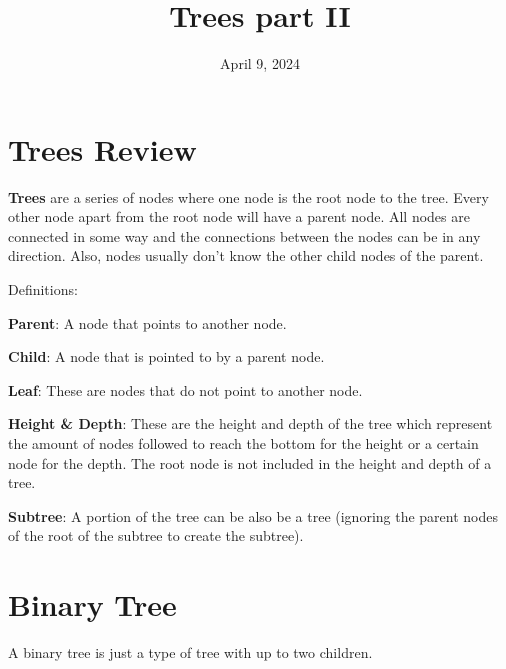 \documentclass[11pt,a4paper,english]{article}
\begin{document}
\title{Trees part II}
\date{April 9, 2024}
\maketitle

\tableofcontents
\section{Trees Review}

\textbf{Trees} are a series of nodes where one node is the root node to the tree. Every other node apart from the root node will have a parent node. All nodes are connected in some way and the connections between the nodes can be in any direction. Also, nodes usually don't know the other child nodes of the parent.

\bigskip
\begin{bluebox}{Definitions:}{

  \begin{itemize} {

      \item \textbf{Parent}: A node that points to another node.
      \item \textbf{Child}: A node that is pointed to by a parent node.
      \item \textbf{Leaf}: These are nodes that do not point to another node.
      \item \textbf{Height \& Depth}: These are the height and depth of the tree which represent the amount of nodes followed to reach the bottom for the height or a certain node for the depth. The root node is not included in the height and depth of a tree.
      \item \textbf{Subtree}: A portion of the tree can be also be a tree (ignoring the parent nodes of the root of the subtree to create the subtree).

  }\end{itemize}

}\end{bluebox}

\bigskip


\section{Binary Tree}

A binary tree is just a type of tree with up to two children.
\end{document}
